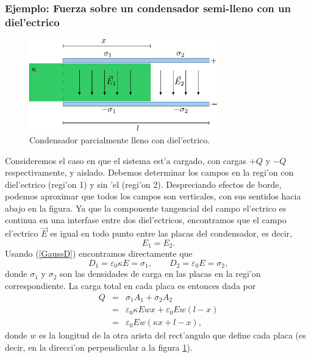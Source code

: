\subsubsection{Ejemplo: Fuerza sobre un condensador semi-lleno con un
diel'ectrico}
\begin{figure}[!h]
\centerline{\includegraphics[height=4cm]{fig/fig-condensador-semi-lleno-01.pdf}}
\caption{Condensador parcialmente lleno con diel'ectrico.}
\label{fig:fccd}
\end{figure}
Consideremos el caso en que el sistema est'a cargado, con cargas $+Q$ y $-Q$
respectivamente, y aislado. Debemos determinar los campos en la regi'on con
diel'ectrico (regi'on 1) y sin 'el (regi'on 2). Despreciando efectos de borde,
podemos aproximar que todos los campos son verticales, con sus sentidos hacia
abajo en la figura. Ya que la componente tangencial del campo el'ectrico es
continua en una interfase entre dos diel'ectricos, encontramos que el campo
el'ectrico $\vec{E}$ es igual en todo punto entre las placas del condensador,
es decir,
\begin{equation}
 E_1=E_2.
\end{equation}
Usando (\ref{GaussD}) encontramos directamente que
\begin{equation}
 D_1=\varepsilon_0\kappa E=\sigma_1, \qquad D_2=\varepsilon_0 E=\sigma_2,
\end{equation}
donde $\sigma_1$ y $\sigma_2$ son las densidades de carga en las placas en la
regi'on correspondiente. La carga total en cada placa es entonces dada por
\begin{eqnarray}
 Q&=&\sigma_1A_1+\sigma_2A_2 \\
&=& \varepsilon_0\kappa E w x+\varepsilon_0E w (l-x) \\
&=& \varepsilon_0Ew\left(\kappa x+l-x\right), \label{Qej}
\end{eqnarray}
donde $w$ es la longitud de la otra arista del rect'angulo que define cada placa (es decir, en la direcci'on perpendicular a la figura \ref{fig:fccd}).

